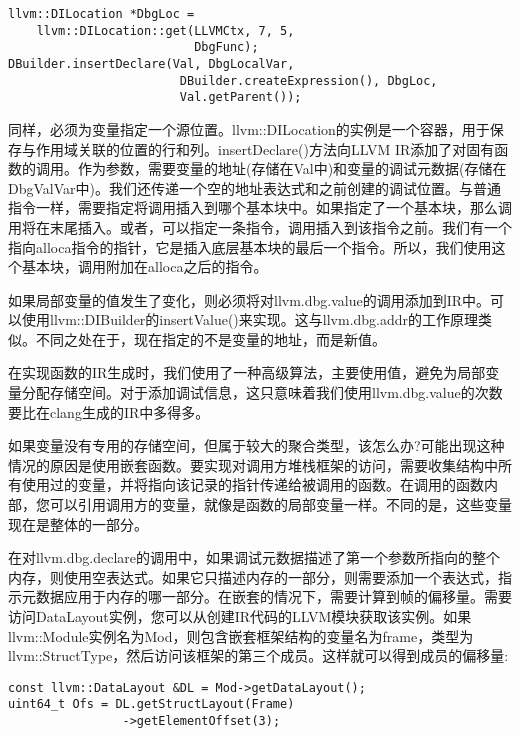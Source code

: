 \begin{lstlisting}[caption={}]
llvm::DILocation *DbgLoc =
	llvm::DILocation::get(LLVMCtx, 7, 5, 
					      DbgFunc);
DBuilder.insertDeclare(Val, DbgLocalVar,
						DBuilder.createExpression(), DbgLoc,
						Val.getParent());
\end{lstlisting}

同样，必须为变量指定一个源位置。llvm::DILocation的实例是一个容器，用于保存与作用域关联的位置的行和列。insertDeclare()方法向LLVM IR添加了对固有函数的调用。作为参数，需要变量的地址(存储在Val中)和变量的调试元数据(存储在DbgValVar中)。我们还传递一个空的地址表达式和之前创建的调试位置。与普通指令一样，需要指定将调用插入到哪个基本块中。如果指定了一个基本块，那么调用将在末尾插入。或者，可以指定一条指令，调用插入到该指令之前。我们有一个指向alloca指令的指针，它是插入底层基本块的最后一个指令。所以，我们使用这个基本块，调用附加在alloca之后的指令。\par

如果局部变量的值发生了变化，则必须将对llvm.dbg.value的调用添加到IR中。可以使用llvm::DIBuilder的insertValue()来实现。这与llvm.dbg.addr的工作原理类似。不同之处在于，现在指定的不是变量的地址，而是新值。\par

在实现函数的IR生成时，我们使用了一种高级算法，主要使用值，避免为局部变量分配存储空间。对于添加调试信息，这只意味着我们使用llvm.dbg.value的次数要比在clang生成的IR中多得多。\par

如果变量没有专用的存储空间，但属于较大的聚合类型，该怎么办?可能出现这种情况的原因是使用嵌套函数。要实现对调用方堆栈框架的访问，需要收集结构中所有使用过的变量，并将指向该记录的指针传递给被调用的函数。在调用的函数内部，您可以引用调用方的变量，就像是函数的局部变量一样。不同的是，这些变量现在是整体的一部分。\par

在对llvm.dbg.declare的调用中，如果调试元数据描述了第一个参数所指向的整个内存，则使用空表达式。如果它只描述内存的一部分，则需要添加一个表达式，指示元数据应用于内存的哪一部分。在嵌套的情况下，需要计算到帧的偏移量。需要访问DataLayout实例，您可以从创建IR代码的LLVM模块获取该实例。如果llvm::Module实例名为Mod，则包含嵌套框架结构的变量名为frame，类型为llvm::StructType，然后访问该框架的第三个成员。这样就可以得到成员的偏移量:\par

\begin{lstlisting}[caption={}]
const llvm::DataLayout &DL = Mod->getDataLayout();
uint64_t Ofs = DL.getStructLayout(Frame)
				->getElementOffset(3);
\end{lstlisting}

